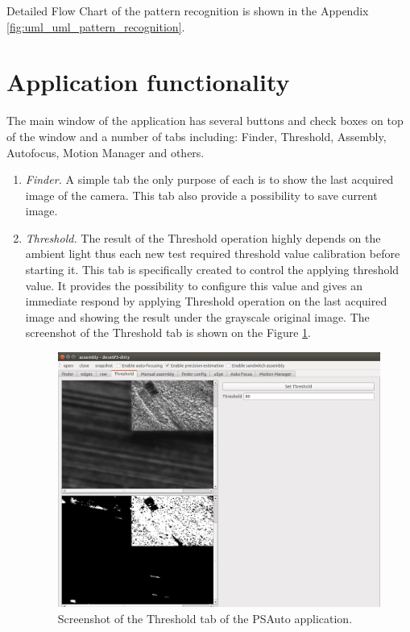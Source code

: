 Detailed Flow Chart of the pattern recognition is shown in the Appendix \ref{fig:uml_uml_pattern_recognition}.

\section{Application functionality}

The main window of the application has several buttons and check boxes on top of the window and a number of tabs including: Finder, Threshold, Assembly, Autofocus, Motion Manager and others.

\begin{enumerate}

\item \emph{Finder.} A simple tab the only purpose of each is to show the last acquired image of the camera. This tab also provide a possibility to save current image.

\item \emph{Threshold.} The result of the Threshold operation highly depends on the ambient light thus each new test required threshold value calibration before starting it. This tab is specifically created to control the applying threshold value. It provides the possibility to configure this value and gives an immediate respond by applying Threshold operation on the last acquired image and showing the result under the grayscale original image. The screenshot of the Threshold tab is shown on the Figure \ref{fig:threshold_screenshot}.

\begin{figure}[ht]\centering
\includegraphics[width=0.7\linewidth]{Data/Control_Software/Threshold_screenshot.png}
\caption{Screenshot of the Threshold tab of the PSAuto application.}
\label{fig:threshold_screenshot}
\end{figure}


\end{enumerate}
